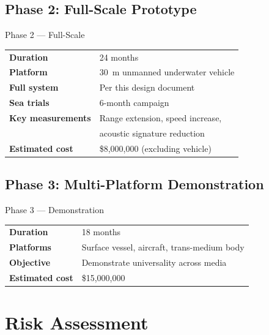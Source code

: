 \documentclass[11pt]{article}
\begin{document}
\subsection{Phase 2: Full-Scale Prototype}

\begin{specbox}{Phase 2 --- Full-Scale}
\begin{tabular}{@{}ll@{}}
\textbf{Duration} & 24 months \\
\textbf{Platform} & 30~m unmanned underwater vehicle \\
\textbf{Full system} & Per this design document \\
\textbf{Sea trials} & 6-month campaign \\
\textbf{Key measurements} & Range extension, speed increase, \\
 & acoustic signature reduction \\
\textbf{Estimated cost} & \$8{,}000{,}000 (excluding vehicle) \\
\end{tabular}
\end{specbox}

\subsection{Phase 3: Multi-Platform Demonstration}

\begin{specbox}{Phase 3 --- Demonstration}
\begin{tabular}{@{}ll@{}}
\textbf{Duration} & 18 months \\
\textbf{Platforms} & Surface vessel, aircraft, trans-medium body \\
\textbf{Objective} & Demonstrate universality across media \\
\textbf{Estimated cost} & \$15{,}000{,}000 \\
\end{tabular}
\end{specbox}

\section{Risk Assessment}
\label{sec:risk}
\end{document}
